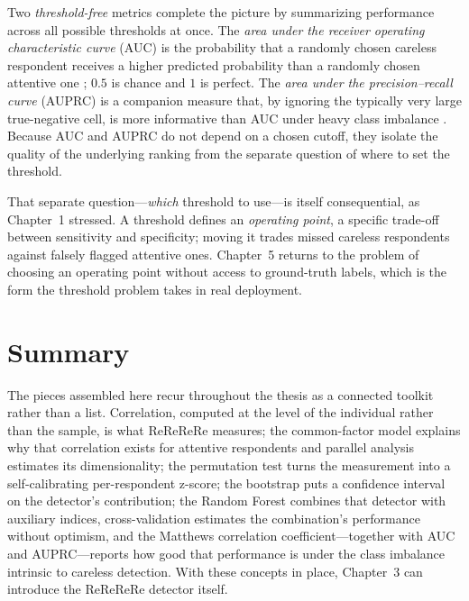 \documentclass[doc,11pt,donotrepeattitle]{apa7}
\begin{document}
Two \emph{threshold-free} metrics complete the picture by summarizing
performance across all possible thresholds at once. The \emph{area under the
receiver operating characteristic curve} (AUC) is the probability that a randomly
chosen careless respondent receives a higher predicted probability than a
randomly chosen attentive one \parencite{hanley1982meaning}; $0.5$ is chance and
$1$ is perfect. The \emph{area under the precision--recall curve} (AUPRC) is a
companion measure that, by ignoring the typically very large true-negative cell,
is more informative than AUC under heavy class imbalance
\parencite{saito2015precision}. Because AUC and AUPRC do not depend on a chosen
cutoff, they isolate the quality of the underlying ranking from the separate
question of where to set the threshold.

That separate question---\emph{which} threshold to use---is itself consequential,
as Chapter~1 stressed. A threshold defines an \emph{operating point}, a specific
trade-off between sensitivity and specificity; moving it trades missed careless
respondents against falsely flagged attentive ones. Chapter~5 returns to the
problem of choosing an operating point without access to ground-truth labels,
which is the form the threshold problem takes in real deployment.

\section{Summary}

The pieces assembled here recur throughout the thesis as a connected toolkit
rather than a list. Correlation, computed at the level of the individual rather
than the sample, is what ReReReRe measures; the common-factor model explains why
that correlation exists for attentive respondents and parallel analysis
estimates its dimensionality; the permutation test turns the measurement into a
self-calibrating per-respondent z-score; the bootstrap puts a confidence
interval on the detector's contribution; the Random Forest combines that
detector with auxiliary indices, cross-validation estimates the combination's
performance without optimism, and the Matthews correlation coefficient---together
with AUC and AUPRC---reports how good that performance is under the class
imbalance intrinsic to careless detection. With these concepts in place,
Chapter~3 can introduce the ReReReRe detector itself.

\printbibliography
\end{document}
